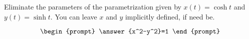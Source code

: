 \documentclass{ximera}
\author{Gregory Hartman \and Matthew Carr}
\begin{document}
\begin{exercise}





Eliminate the parameters of the parametrization given by $x(t)=\cosh t$ and $y(t)=\sinh t$. You can leave $x$ and $y$ implicitly defined, if need be.

\[
\begin{prompt}
\answer{x^2-y^2}=1
\end{prompt}
\]

\end{exercise}
\end{document}

